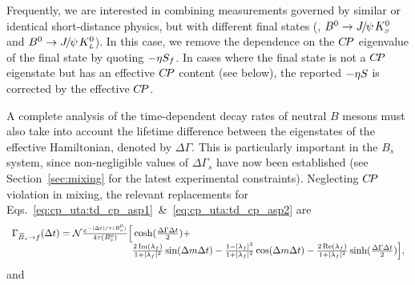 Frequently, we are interested in combining measurements 
governed by similar or identical short-distance physics,
but with different final states
(\eg, $B^0 \to {J\mskip -3mu/\mskip -2mu\psi\mskip 2mu} K^0_{\scriptscriptstyle S}$ and $B^0 \to {J\mskip -3mu/\mskip -2mu\psi\mskip 2mu} K^0_{\scriptscriptstyle L}$).
In this case, we remove the dependence on the $C\!P$ eigenvalue 
of the final state by quoting $-{\eta} S_f$.
In cases where the final state is not a $C\!P$ eigenstate but has
an effective $C\!P$ content (see below),
the reported $-{\eta} S$ is corrected by the effective $C\!P$.

\label{sec:cp_uta:notations:Bs}

A complete analysis of the time-dependent decay rates of 
neutral $B$ mesons must also take into account the lifetime difference
between the eigenstates of the effective Hamiltonian, 
denoted by $\Delta \Gamma$.
This is particularly important in the $B_s$ system,
since non-negligible values of $\Delta \Gamma_s$ have now been established
(see Section~\ref{sec:mixing} for the latest experimental constraints).
Neglecting $C\!P$ violation in mixing,
the relevant replacements for 
Eqs.~\ref{eq:cp_uta:td_cp_asp1}~\&~\ref{eq:cp_uta:td_cp_asp2} 
are~\cite{Dunietz:2000cr}
\begin{equation}
  \label{eq:cp_uta:td_cp_bs_asp1}
  \begin{array}{lcr}
    \mc{2}{l}{
      \Gamma_{\Bsb \to f} (\Delta t) = 
      {\cal N} %
      \frac{e^{-| \Delta t | / \tau(\Bs)}}{4\tau(\Bs)}
      \Big[ 
      \cosh(\frac{\Delta \Gamma \Delta t}{2}) +
    } & \hspace{40mm} \\
    \hspace{40mm} &
    \mc{2}{r}{
      \frac{2\, \Im(\lambda_f)}{1 + |\lambda_f|^2} \sin(\Delta m \Delta t) -
      \frac{1 - |\lambda_f|^2}{1 + |\lambda_f|^2} \cos(\Delta m \Delta t) -
      \frac{2\, \Re(\lambda_f)}{1 + |\lambda_f|^2} \sinh(\frac{\Delta \Gamma \Delta t}{2})
      \Big],
    } \\
  \end{array}
\end{equation}
and

